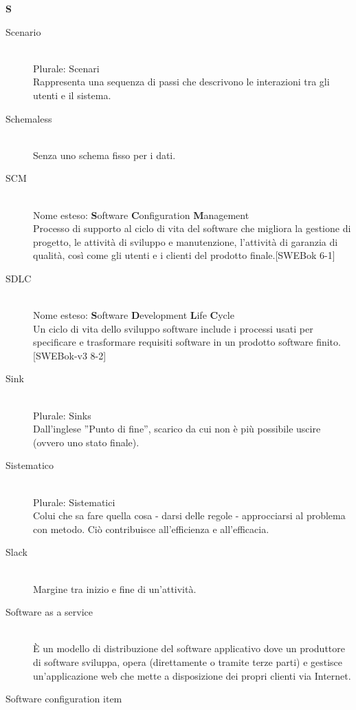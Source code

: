 \newpage 
\begin{center}\textbf{\Huge{S}}\end{center}
\begin{description}\item[Scenario] \hfill \\
Plurale: Scenari\\ 
Rappresenta una sequenza di passi che descrivono le interazioni tra gli utenti e il sistema.
 \item[Schemaless] \hfill \\
Senza uno schema fisso per i dati.
 \item[SCM] \hfill \\
Nome esteso: \textbf{S}oftware \textbf{C}onfiguration \textbf{M}anagement\\ 
Processo di supporto al ciclo di vita del software che migliora la gestione di progetto, le attività di sviluppo e manutenzione, l'attività di garanzia di qualità, così come gli utenti e i clienti del prodotto finale.[SWEBok 6-1]
 \item[SDLC] \hfill \\
Nome esteso: \textbf{S}oftware \textbf{D}evelopment \textbf{L}ife \textbf{C}ycle\\ 
Un ciclo di vita dello sviluppo software include i processi usati per specificare e trasformare requisiti software in un prodotto software finito. [SWEBok-v3 8-2]
 \item[Sink] \hfill \\
Plurale: Sinks\\ 
Dall'inglese ''Punto di fine'', scarico da cui non è più possibile uscire (ovvero uno stato finale).
 \item[Sistematico] \hfill \\
Plurale: Sistematici\\ 
Colui che sa fare quella cosa - darsi delle regole -
		approcciarsi al problema con metodo. Ciò contribuisce all'efficienza e all'efficacia.
 \item[Slack] \hfill \\
Margine tra inizio e fine di un'attività.
 \item[Software as a service] \hfill \\
È un modello di distribuzione del software applicativo
		dove un produttore di software sviluppa, opera (direttamente o tramite terze parti) e gestisce un'applicazione web che mette a disposizione dei propri clienti via Internet.
 \item[Software configuration item] \hfill \\

\end{description}
